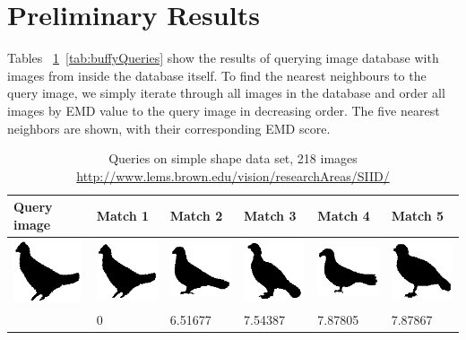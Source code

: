 \documentclass[10pt,a4paper]{article}
\begin{document}
\section{Preliminary Results}

Tables ~\ref{tab:shapeQueries}~\ref{tab:buffyQueries} show the results of querying image database with images from inside the database itself. To find the nearest neighbours to the query image, we simply iterate through all images in the database and order all images by EMD value to the query image in decreasing order. The five nearest neighbors are shown, with their corresponding EMD score.

\begin{table}
    \caption{Queries on simple shape data set, 218 images \url{http://www.lems.brown.edu/vision/researchAreas/SIID/}}
    \label{tab:shapeQueries}
    \begin{tabular}{|l|l|l|l|l|l|}
        \hline
        Query image & Match 1 & Match 2 & Match 3 & Match 4 & Match 5 \\ \hline

        \includegraphics[width=20mm]{queries/bird09.png} &	
	\includegraphics[width=20mm]{queries/bird09.png}  & 
	\includegraphics[width=20mm]{queries/bird18.png}  &
	\includegraphics[width=20mm]{queries/bird07.png}  &
	\includegraphics[width=20mm]{queries/bird19.png} &
	\includegraphics[width=20mm]{queries/bird02.png} \\ 
	~ & 0 & 6.51677 & 7.54387 &  7.87805 & 7.87867 \\ \hline


\end{tabular}
\end{table}
\end{document}

